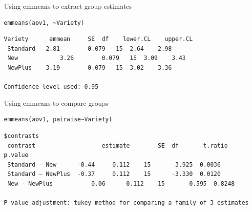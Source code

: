 \documentclass[10pt]{beamer}
\makeatletter
\newenvironment{kframe}{%
 \def\at@end@of@kframe{}%
 \ifinner\ifhmode%
  \def\at@end@of@kframe{\end{minipage}}%
  \begin{minipage}{\columnwidth}%
 \fi\fi%
 \def\FrameCommand##1{\hskip\@totalleftmargin \hskip-\fboxsep
 \colorbox{shadecolor}{##1}\hskip-\fboxsep
     \hskip-\linewidth \hskip-\@totalleftmargin \hskip\columnwidth}%
 \MakeFramed {\advance\hsize-\width
   \@totalleftmargin\z@ \linewidth\hsize
   \@setminipage}}%
 {\par\unskip\endMakeFramed%
 \at@end@of@kframe}
\newenvironment{knitrout}{}{} %
\makeatother
\begin{document}
\begin{frame}[fragile]{Using emmeans to extract group estimates}
   \begin{knitrout}
\color{fgcolor}\begin{kframe}
\footnotesize
\begin{verbatim}
emmeans(aov1, ~Variety)
\end{verbatim}
\end{kframe}
\end{knitrout}
 
   \begin{knitrout}
\color{fgcolor}\begin{kframe}
\footnotesize
\begin{verbatim}
Variety   	 emmean   	SE 	df    lower.CL    upper.CL
 Standard 	2.81 		0.079 	15 	2.64 	2.98
 New      		3.26 		0.079 	15 	3.09 	3.43
 NewPlus  	3.19 		0.079 	15 	3.02 	3.36
 
Confidence level used: 0.95 
\end{verbatim}
\end{kframe}
\end{knitrout}

\end{frame}

\begin{frame}[fragile]{Using emmeans to compare groups}
   \begin{knitrout}
\color{fgcolor}\begin{kframe}
\footnotesize
\begin{verbatim}
emmeans(aov1, pairwise~Variety)
\end{verbatim}
\end{kframe}
\end{knitrout}
 
   \begin{knitrout}
\color{fgcolor}\begin{kframe}
\footnotesize
\begin{verbatim}
$contrasts
 contrast              		estimate        SE 	df  	 t.ratio  p.value
 Standard - New    	 -0.44 	   0.112 	15  	-3.925  0.0036
 Standard – NewPlus	 -0.37 	   0.112 	15  	-3.330  0.0120
 New - NewPlus      	 0.06 	   0.112 	15   	 0.595  0.8248
 
P value adjustment: tukey method for comparing a family of 3 estimates
\end{verbatim}
\end{kframe}
\end{knitrout}

\end{frame}
\end{document}
